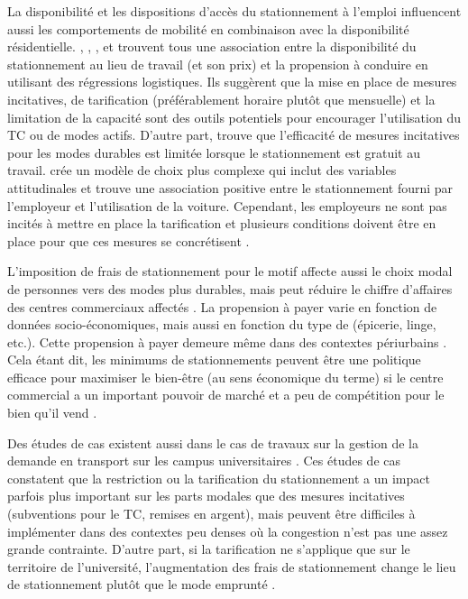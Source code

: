         
        La disponibilité et les dispositions d'accès du stationnement à l'emploi influencent aussi les comportements de mobilité en combinaison avec la disponibilité résidentielle. \parencite{den_braver_development_2022}, \textcite{khordagui_commute_2019}, \textcite{christiansen_parking_2017}, \textcite{wilson_estimating_1992} et \textcite{hess_effect_2001} trouvent tous une association entre la disponibilité du stationnement au lieu de travail (et son prix) et la propension à conduire en utilisant des régressions logistiques. Ils suggèrent que la mise en place de  mesures incitatives, de tarification (préférablement horaire plutôt que mensuelle) et la limitation de la capacité sont des outils potentiels pour encourager l'utilisation du \ac{TC} ou de modes actifs. D'autre part, \textcite{hamre_commuter_2014} trouve que l'efficacité de mesures incitatives pour les modes durables est limitée lorsque le stationnement est gratuit au travail. \textcite{parmar_analysis_2023} crée un modèle de choix plus complexe qui inclut des variables attitudinales et trouve une association positive entre le stationnement fourni par l'employeur et l'utilisation de la voiture. Cependant, les employeurs ne sont pas incités à mettre en place la tarification et plusieurs conditions doivent être en place pour que ces mesures se concrétisent \parencite{rye_overcoming_2005}.\par

        L'imposition de frais de stationnement pour le motif \fg{} affecte aussi le choix modal de personnes vers des modes plus durables, mais peut réduire le chiffre d'affaires des centres commerciaux affectés \parencite{lin_joint_2014,van_der_waerden_consumer_2009,au_users_2016,newmark_examining_2007}. La propension à payer varie en fonction de données socio-économiques, mais aussi en fonction du type de \fg{} (épicerie, linge, etc.). Cette propension à payer demeure même dans des contextes périurbains \parencite{newmark_examining_2007,olus_inan_spillover_2019}. Cela étant dit, les minimums de stationnements peuvent être une politique efficace  pour maximiser le bien-être (au sens économique du terme) si le centre commercial a un important pouvoir de marché et a peu de compétition pour le bien qu'il vend \parencite{olus_inan_spillover_2019}.\par

        Des études de cas existent aussi dans le cas de travaux sur la gestion de la demande en transport sur les campus universitaires \parencite{senft_u-pass_2005,sweet_parking_2019,melia_what_2018, yan_effectiveness_2019}. Ces études de cas constatent que la restriction ou la tarification du stationnement a un impact parfois plus important sur les parts modales que des mesures incitatives (subventions pour le \ac{TC}, remises en argent), mais peuvent être difficiles à implémenter dans des contextes peu denses où la congestion n'est pas une assez grande contrainte\parencite{sweet_parking_2019}. D'autre part, si la tarification ne s'applique que sur le territoire de l'université, l'augmentation des frais de stationnement change le lieu de stationnement plutôt que le mode emprunté \parencite{yan_effectiveness_2019}. \par

